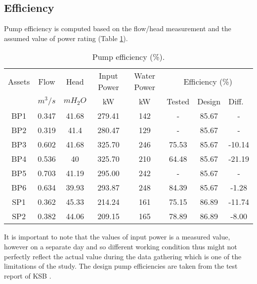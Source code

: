 \subsection{Efficiency}



Pump efficiency is computed based on the flow/head measurement and the assumed value of power rating (Table \ref{ch05_tbl_efficiency}). 

\begin{table}[!h]

	\caption{Pump efficiency (\%).}

	\label{ch05_tbl_efficiency}

	{\footnotesize


	\begin{tabular}{c|c|c|c|c|c|l|l}
\hline
Assets & Flow & Head & Input Power & Water Power & \multicolumn{3}{c}{Efficiency (\%)} \\ 
\cline{6-8}
 & $m^3/s$ & $mH_2O$ & kW & kW & Tested & Design & Diff. \\ 
\hline
BP1 & 0.347 & 41.68 & 279.41 & 142 & - & \multicolumn{1}{c|}{85.67} & \multicolumn{1}{c}{-} \\ 
BP2 & 0.319 & 41.4 & 280.47 & 129 & - & \multicolumn{1}{c|}{85.67} & \multicolumn{1}{c}{-} \\ 
BP3 & 0.602 & 41.68 & 325.70 & 246 & 75.53 & \multicolumn{1}{c|}{85.67} & \multicolumn{1}{c}{-10.14} \\ 
BP4 & 0.536 & 40 & 325.70 & 210 & 64.48 & \multicolumn{1}{c|}{85.67} & \multicolumn{1}{c}{-21.19} \\ 
BP5 & 0.703 & 41.19 & 295.00 & 242 & - & \multicolumn{1}{c|}{85.67} & \multicolumn{1}{c}{-} \\ 
BP6 & 0.634 & 39.93 & 293.87 & 248 & 84.39 & \multicolumn{1}{c|}{85.67} & \multicolumn{1}{c}{-1.28} \\ 
SP1 & 0.362 & 45.33 & 214.24 & 161 & 75.15 & \multicolumn{1}{c|}{86.89} & \multicolumn{1}{c}{-11.74} \\ 
SP2 & 0.382 & 44.06 & 209.15 & 165 & 78.89 & \multicolumn{1}{c|}{86.89} & \multicolumn{1}{c}{-8.00} \\ 
\hline
\end{tabular}

	}

\end{table}



It is important to note that the values of input power is a measured value, however on a separate day and so different working condition thus might not perfectly reflect 
the actual value during the data gathering which is one of the limitations of the study.
The design pump efficiencies are taken from the test report of
KSB \cite{KSB2010}. 



